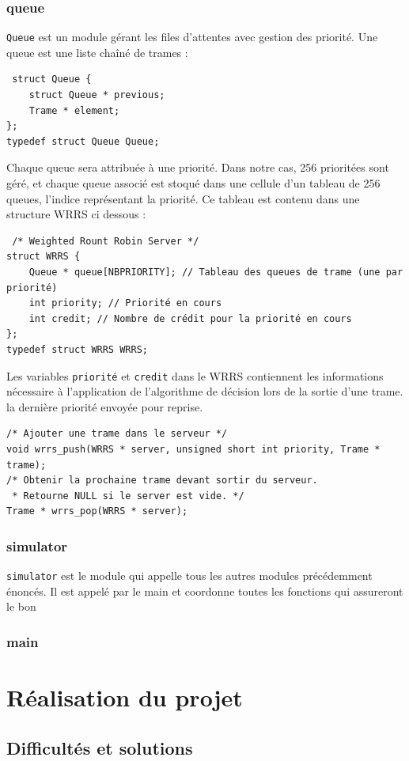 \documentclass[a4paper,11pt]{article}
\begin{document}
\subsubsection{queue}
\texttt{Queue} est un module gérant les files d'attentes avec gestion
des priorité. Une queue est une liste chaîné de trames :
\begin{verbatim}
 struct Queue {
    struct Queue * previous;
    Trame * element;
};
typedef struct Queue Queue;
\end{verbatim}
Chaque queue sera attribuée à une priorité. Dans notre cas, 256 prioritées
sont géré, et chaque queue associé est stoqué dans une cellule d'un
tableau de 256 queues, l'indice représentant la priorité.
Ce tableau est contenu dans une structure WRRS ci dessous :
\begin{verbatim}
 /* Weighted Rount Robin Server */
struct WRRS {
    Queue * queue[NBPRIORITY]; // Tableau des queues de trame (une par priorité)
    int priority; // Priorité en cours
    int credit; // Nombre de crédit pour la priorité en cours
};
typedef struct WRRS WRRS;
\end{verbatim}
Les variables \texttt{priorité} et \texttt{credit} dans le WRRS
contiennent les informations nécessaire à l'application de l'algorithme
de décision lors de la sortie d'une trame. la dernière priorité envoyée pour reprise.

\begin{verbatim}
/* Ajouter une trame dans le serveur */
void wrrs_push(WRRS * server, unsigned short int priority, Trame * trame);
/* Obtenir la prochaine trame devant sortir du serveur.
 * Retourne NULL si le server est vide. */
Trame * wrrs_pop(WRRS * server);
\end{verbatim}
\subsubsection{simulator}
\texttt{simulator} est le module qui appelle tous les autres modules précédemment énoncés. Il est appelé par le main et coordonne toutes les fonctions qui assureront le bon  
\subsubsection{main}

\section{Réalisation du projet}

\subsection{Difficultés et solutions}
\end{document}
